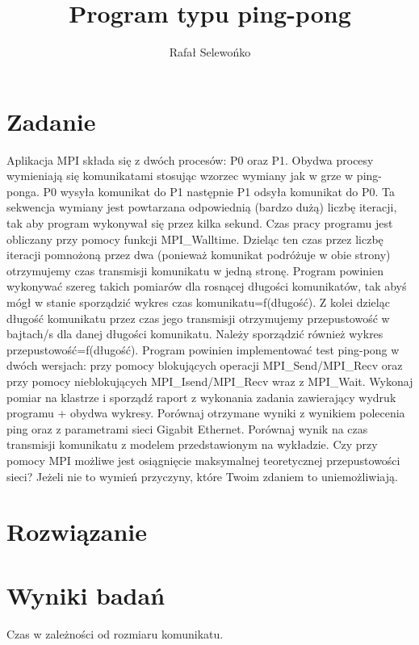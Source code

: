 \documentclass[a4paper,12pt]{article}
\title{Program typu ping-pong}
\author{Rafał Selewońko}
\begin{document}
\maketitle
 
\section{Zadanie}\label{sec:zadanie}
Aplikacja MPI składa się z dwóch procesów: P0 oraz P1. Obydwa procesy 
wymieniają się komunikatami stosując wzorzec wymiany jak w grze w ping-ponga. P0 wysyła 
komunikat do P1 następnie P1 odsyła komunikat do P0. Ta sekwencja wymiany jest powtarzana 
odpowiednią (bardzo dużą) liczbę iteracji, tak aby program wykonywał się przez kilka sekund. Czas 
pracy programu jest obliczany przy pomocy funkcji MPI\_Walltime. Dzieląc ten czas przez liczbę 
iteracji pomnożoną przez dwa (ponieważ komunikat podróżuje w obie strony) otrzymujemy czas 
transmisji komunikatu w jedną stronę. Program powinien wykonywać szereg takich pomiarów dla 
rosnącej długości komunikatów, tak abyś mógł w stanie sporządzić wykres 
czas komunikatu=f(długość). Z kolei dzieląc długość komunikatu przez czas jego transmisji otrzymujemy przepustowość w bajtach/s 
dla danej długości komunikatu. Należy sporządzić również wykres przepustowość=f(długość). 
Program powinien implementować test ping-pong w dwóch wersjach: przy pomocy blokujących 
operacji MPI\_Send/MPI\_Recv oraz przy pomocy nieblokujących MPI\_Isend/MPI\_Recv wraz z 
MPI\_Wait. Wykonaj pomiar na klastrze i sporządź raport z wykonania zadania zawierający wydruk 
programu + obydwa wykresy. Porównaj otrzymane wyniki z wynikiem polecenia ping oraz z 
parametrami sieci Gigabit Ethernet. Porównaj wynik na czas transmisji komunikatu z modelem 
przedstawionym na wykładzie. Czy przy pomocy MPI możliwe jest osiągnięcie maksymalnej 
teoretycznej przepustowości sieci? Jeżeli nie to wymień przyczyny, które Twoim zdaniem to 
uniemożliwiają.
 
\pagebreak
\section{Rozwiązanie}\label{sec:kod}



\section{Wyniki badań}

\begin{table}[t]
\centering
{}
\caption{Czas w zależności od rozmiaru komunikatu.}
\label{tabela_czas}
\end{table}
\end{document}

